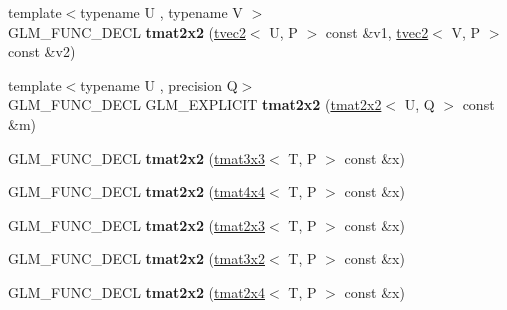 \begin{DoxyCompactItemize}
\item 
\hypertarget{structglm_1_1tmat2x2_ab910eb77d8f50dfa02ad062bb429e0a5}{{\footnotesize template$<$typename U , typename V $>$ }\\G\-L\-M\-\_\-\-F\-U\-N\-C\-\_\-\-D\-E\-C\-L {\bfseries tmat2x2} (\hyperlink{structglm_1_1tvec2}{tvec2}$<$ U, P $>$ const \&v1, \hyperlink{structglm_1_1tvec2}{tvec2}$<$ V, P $>$ const \&v2)}\label{structglm_1_1tmat2x2_ab910eb77d8f50dfa02ad062bb429e0a5}

\item 
\hypertarget{structglm_1_1tmat2x2_add527359c118148fb8984d4868e0dc7f}{{\footnotesize template$<$typename U , precision Q$>$ }\\G\-L\-M\-\_\-\-F\-U\-N\-C\-\_\-\-D\-E\-C\-L G\-L\-M\-\_\-\-E\-X\-P\-L\-I\-C\-I\-T {\bfseries tmat2x2} (\hyperlink{structglm_1_1tmat2x2}{tmat2x2}$<$ U, Q $>$ const \&m)}\label{structglm_1_1tmat2x2_add527359c118148fb8984d4868e0dc7f}

\item 
\hypertarget{structglm_1_1tmat2x2_a21e814f61b4c8769f9e7ac36e531fc3a}{G\-L\-M\-\_\-\-F\-U\-N\-C\-\_\-\-D\-E\-C\-L {\bfseries tmat2x2} (\hyperlink{structglm_1_1tmat3x3}{tmat3x3}$<$ T, P $>$ const \&x)}\label{structglm_1_1tmat2x2_a21e814f61b4c8769f9e7ac36e531fc3a}

\item 
\hypertarget{structglm_1_1tmat2x2_a8da598daa30e0df8eba907c63cff1e7a}{G\-L\-M\-\_\-\-F\-U\-N\-C\-\_\-\-D\-E\-C\-L {\bfseries tmat2x2} (\hyperlink{structglm_1_1tmat4x4}{tmat4x4}$<$ T, P $>$ const \&x)}\label{structglm_1_1tmat2x2_a8da598daa30e0df8eba907c63cff1e7a}

\item 
\hypertarget{structglm_1_1tmat2x2_ac50ef056ce996b1af6066382eeb49a4f}{G\-L\-M\-\_\-\-F\-U\-N\-C\-\_\-\-D\-E\-C\-L {\bfseries tmat2x2} (\hyperlink{structglm_1_1tmat2x3}{tmat2x3}$<$ T, P $>$ const \&x)}\label{structglm_1_1tmat2x2_ac50ef056ce996b1af6066382eeb49a4f}

\item 
\hypertarget{structglm_1_1tmat2x2_a06366377c97a00ee72ba66718ab92751}{G\-L\-M\-\_\-\-F\-U\-N\-C\-\_\-\-D\-E\-C\-L {\bfseries tmat2x2} (\hyperlink{structglm_1_1tmat3x2}{tmat3x2}$<$ T, P $>$ const \&x)}\label{structglm_1_1tmat2x2_a06366377c97a00ee72ba66718ab92751}

\item 
\hypertarget{structglm_1_1tmat2x2_ada3ffdd9349a053d27ffd29afa096618}{G\-L\-M\-\_\-\-F\-U\-N\-C\-\_\-\-D\-E\-C\-L {\bfseries tmat2x2} (\hyperlink{structglm_1_1tmat2x4}{tmat2x4}$<$ T, P $>$ const \&x)}\label{structglm_1_1tmat2x2_ada3ffdd9349a053d27ffd29afa096618}


\end{DoxyCompactItemize}
